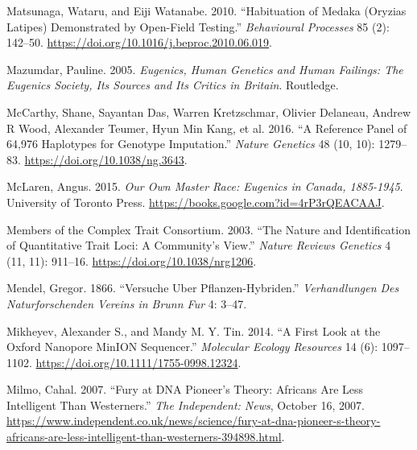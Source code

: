 \documentclass[
]{book}
\newlength{\cslhangindent}
\newlength{\cslentryspacingunit} %
\newenvironment{CSLReferences}[2] %
 {%
  \setlength{\parindent}{0pt}
  \ifodd #1
  \let\oldpar\par
  \def\par{\hangindent=\cslhangindent\oldpar}
  \fi
  \setlength{\parskip}{#2\cslentryspacingunit}
 }%
 {}
\begin{document}
\begin{CSLReferences}{1}{0}
\leavevmode{}%
Matsunaga, Wataru, and Eiji Watanabe. 2010. {``Habituation of Medaka ({Oryzias} Latipes) Demonstrated by Open-Field Testing.''} \emph{Behavioural Processes} 85 (2): 142--50. \url{https://doi.org/10.1016/j.beproc.2010.06.019}.

\leavevmode{}%
Mazumdar, Pauline. 2005. \emph{Eugenics, Human Genetics and Human Failings: The {Eugenics Society}, Its Sources and Its Critics in {Britain}}. {Routledge}.

\leavevmode{}%
McCarthy, Shane, Sayantan Das, Warren Kretzschmar, Olivier Delaneau, Andrew R Wood, Alexander Teumer, Hyun Min Kang, et al. 2016. {``A Reference Panel of 64,976 Haplotypes for Genotype Imputation.''} \emph{Nature Genetics} 48 (10, 10): 1279--83. \url{https://doi.org/10.1038/ng.3643}.

\leavevmode{}%
McLaren, Angus. 2015. \emph{Our {Own Master Race}: {Eugenics} in {Canada}, 1885-1945}. {University of Toronto Press}. \url{https://books.google.com?id=4rP3rQEACAAJ}.

\leavevmode{}%
Members of the Complex Trait Consortium. 2003. {``The Nature and Identification of Quantitative Trait Loci: A Community's View.''} \emph{Nature Reviews Genetics} 4 (11, 11): 911--16. \url{https://doi.org/10.1038/nrg1206}.

\leavevmode{}%
Mendel, Gregor. 1866. {``Versuche Uber Pflanzen-Hybriden.''} \emph{Verhandlungen Des Naturforschenden Vereins in Brunn Fur} 4: 3--47.

\leavevmode{}%
Mikheyev, Alexander S., and Mandy M. Y. Tin. 2014. {``A First Look at the {Oxford Nanopore MinION} Sequencer.''} \emph{Molecular Ecology Resources} 14 (6): 1097--1102. \url{https://doi.org/10.1111/1755-0998.12324}.

\leavevmode{}%
Milmo, Cahal. 2007. {``Fury at {DNA} Pioneer's Theory: {Africans} Are Less Intelligent Than {Westerners}.''} \emph{The Independent: News}, October 16, 2007. \url{https://www.independent.co.uk/news/science/fury-at-dna-pioneer-s-theory-africans-are-less-intelligent-than-westerners-394898.html}.


\end{CSLReferences}
\end{document}
